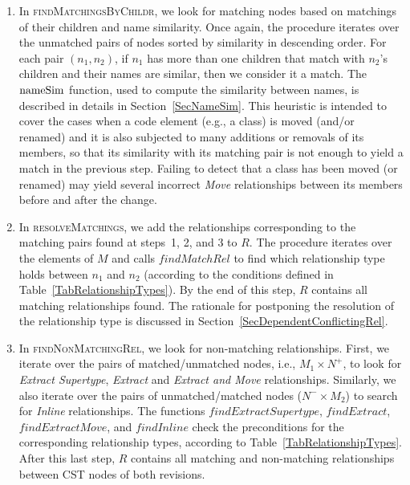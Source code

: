 \begin{enumerate}
\item In \textsc{findMatchingsByChildr}, we look for matching nodes based on matchings of their children and name similarity. 
Once again, the procedure iterates over the unmatched pairs of nodes sorted by similarity in descending order.
For each pair $(n_1, n_2)$, if $n_1$ has more than one children that match with $n_2$'s children and their names are similar, then we consider it a match. The $\operatorname{nameSim}$ function, used to compute the similarity between names, is described in details in Section~\ref{SecNameSim}.
This heuristic is intended to cover the cases when a code element (e.g., a class) is moved (and/or renamed) and it is also subjected to many additions or removals of its members, so that its similarity with its matching pair is not enough to yield a match in the previous step.
Failing to detect that a class has been moved (or renamed) may yield several incorrect \textit{Move} relationships between its members before and after the change.


\item In \textsc{resolveMatchings}, we add the relationships corresponding to the matching pairs found at steps~1, 2, and 3 to $R$.
The procedure iterates over the elements of $M$ and calls $\mathit{findMatchRel}$ to find which relationship type holds between $n_1$ and $n_2$ (according to the conditions defined in Table~\ref{TabRelationshipTypes}).
By the end of this step, $R$ contains all matching relationships found.
The rationale for postponing the resolution of the relationship type is discussed in Section~\ref{SecDependentConflictingRel}.

\item In \textsc{findNonMatchingRel}, we look for non-matching relationships.
First, we iterate over the pairs of matched/unmatched nodes, i.e., $M_1 \times N^+$, to look for \textit{Extract Supertype}, \textit{Extract} and \textit{Extract and Move} relationships.
Similarly, we also iterate over the pairs of unmatched/matched nodes ($N^- \times M_2$) to search for \textit{Inline} relationships.
The functions $findExtractSupertype$, $findExtract$, $findExtractMove$, and $findInline$ check the  preconditions for the corresponding relationship types, according to Table~\ref{TabRelationshipTypes}.
After this last step, $R$ contains all matching and non-matching relationships between CST nodes of both revisions.
\end{enumerate}


